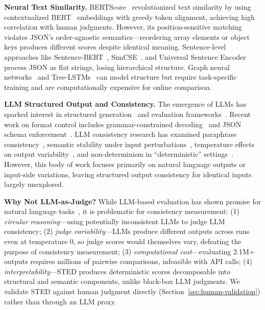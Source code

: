 \documentclass{article}
\theoremstyle{plain}
\theoremstyle{definition}
\begin{document}
\textbf{Neural Text Similarity.} BERTScore~\cite{Zhang2020} revolutionized text similarity by using contextualized BERT~\cite{Devlin2019} embeddings with greedy token alignment, achieving high correlation with human judgments. However, its position-sensitive matching violates JSON's order-agnostic semantics---reordering array elements or object keys produces different scores despite identical meaning. Sentence-level approaches like Sentence-BERT~\cite{Reimers2019}, SimCSE~\cite{Gao2021}, and Universal Sentence Encoder~\cite{Cer2018} process JSON as flat strings, losing hierarchical structure. Graph neural networks~\cite{Hamilton2017,Velickovic2018} and Tree-LSTMs~\cite{Tai2015} can model structure but require task-specific training and are computationally expensive for online comparison.

\textbf{LLM Structured Output and Consistency.} The emergence of LLMs has sparked interest in structured generation~\cite{Bubeck2023,Liang2022} and evaluation frameworks~\cite{yang2025structeval,shorten2024structuredrag}. Recent work on format control includes grammar-constrained decoding~\cite{wang-etal-2025-verifiable} and JSON schema enforcement~\cite{geng2025jsonschema}. LLM consistency research has examined paraphrase consistency~\cite{elazar2021measuring}, semantic stability under input perturbations~\cite{Raj2023}, temperature effects on output variability~\cite{renze2024effect,renze-2024-effect}, and non-determinism in ``deterministic'' settings~\cite{baldwin2024nondeterminism}. However, this body of work focuses primarily on natural language outputs or input-side variations, leaving structured output consistency for identical inputs largely unexplored.

\textbf{Why Not LLM-as-Judge?} While LLM-based evaluation has shown promise for natural language tasks~\cite{zheng2023judging}, it is problematic for consistency measurement: (1) \textit{circular reasoning}---using potentially inconsistent LLMs to judge LLM consistency; (2) \textit{judge variability}---LLMs produce different outputs across runs even at temperature 0, so judge scores would themselves vary, defeating the purpose of consistency measurement; (3) \textit{computational cost}---evaluating 2.1M+ outputs requires millions of pairwise comparisons, infeasible with API calls; (4) \textit{interpretability}---STED produces deterministic scores decomposable into structural and semantic components, unlike black-box LLM judgments. We validate STED against human judgment directly (Section~\ref{sec:human-validation}) rather than through an LLM proxy.
\end{document}
